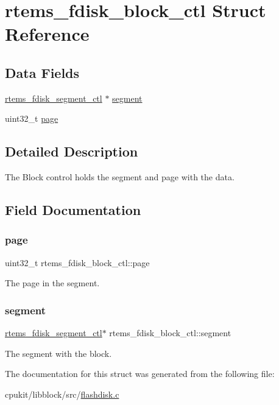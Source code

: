 \hypertarget{structrtems__fdisk__block__ctl}{}\section{rtems\+\_\+fdisk\+\_\+block\+\_\+ctl Struct Reference}
\label{structrtems__fdisk__block__ctl}
\subsection*{Data Fields}
\begin{DoxyCompactItemize}
\item 
\mbox{\hyperlink{structrtems__fdisk__segment__ctl}{rtems\+\_\+fdisk\+\_\+segment\+\_\+ctl}} $\ast$ \mbox{\hyperlink{structrtems__fdisk__block__ctl_ae2750aa2ba5c9aa0b3e4a0d591c1a190}{segment}}
\item 
uint32\+\_\+t \mbox{\hyperlink{structrtems__fdisk__block__ctl_ab01639c3cf4ddf0d1001a29a22914ebf}{page}}
\end{DoxyCompactItemize}


\subsection{Detailed Description}
The Block control holds the segment and page with the data. 

\subsection{Field Documentation}
\mbox{\label{structrtems__fdisk__block__ctl_ab01639c3cf4ddf0d1001a29a22914ebf}} 
\subsubsection{\texorpdfstring{page}{page}}
{\footnotesize\ttfamily uint32\+\_\+t rtems\+\_\+fdisk\+\_\+block\+\_\+ctl\+::page}

The page in the segment. \mbox{\label{structrtems__fdisk__block__ctl_ae2750aa2ba5c9aa0b3e4a0d591c1a190}} 
\subsubsection{\texorpdfstring{segment}{segment}}
{\footnotesize\ttfamily \mbox{\hyperlink{structrtems__fdisk__segment__ctl}{rtems\+\_\+fdisk\+\_\+segment\+\_\+ctl}}$\ast$ rtems\+\_\+fdisk\+\_\+block\+\_\+ctl\+::segment}

The segment with the block. 

The documentation for this struct was generated from the following file\+:\begin{DoxyCompactItemize}
\item 
cpukit/libblock/src/\mbox{\hyperlink{flashdisk_8c}{flashdisk.\+c}}\end{DoxyCompactItemize}
